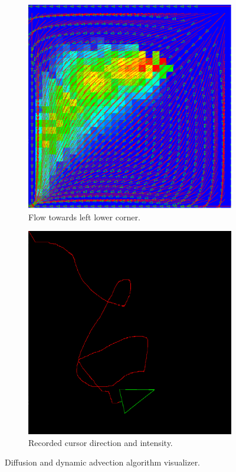 \documentclass[12pt, titlepage]{article}
\begin{document}
\begin{figure}[h!]
  \centering
  \begin{subfigure}[b]{0.4\linewidth}
    \includegraphics[width=\linewidth]{images/sim3.png}
    \caption{Flow towards left lower corner.}
  \end{subfigure}
  \begin{subfigure}[b]{0.4\linewidth}
    \includegraphics[width=\linewidth]{images/cursor.png}
    \caption{Recorded cursor direction and intensity.}
  \end{subfigure}
  \caption{Diffusion and dynamic advection algorithm visualizer.}
  \label{fig:left flow with cursor follow}
\end{figure}
\end{document}
